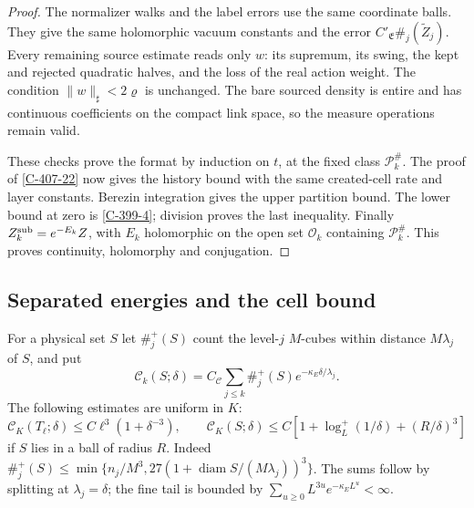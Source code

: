 \documentclass[11pt,letterpaper,reqno]{amsart}
\theoremstyle{definition}
\theoremstyle{remark}
\begin{document}
\begin{proof}
The normalizer walks and the label errors use the same
coordinate balls. They give the same holomorphic vacuum
constants and the error $C'_{\mathfrak E}\#_j(\widetilde Z_j)$.
Every remaining source estimate reads only $w$: its supremum,
its swing, the kept and rejected quadratic halves, and the
loss of the real action weight. The condition
$\|w\|_\sharp<2\varrho$ is unchanged. The bare sourced
density is entire and has continuous coefficients on the
compact link space, so the measure operations remain valid.

These checks prove the format by induction on $t$, at the
fixed class $\mathcal P_k^\#$. The proof of \cref{C-407-22}
now gives the history bound with the same created-cell rate
and layer constants. Berezin integration gives the upper
partition bound. The lower bound at zero is
\cref{C-399-4}; division proves the last inequality.
Finally $Z_k^{\rm sub}=e^{-E_k}Z$, with $E_k$ holomorphic on
the open set $\mathscr O_k$ containing $\mathcal P_k^\#$.
This proves continuity, holomorphy and conjugation.
\end{proof}

\subsection{Separated energies and the cell bound}

For a physical set $S$ let $\#_j^+(S)$ count the level-$j$
$M$-cubes within distance $M\lambda_j$ of $S$, and put
\[
 \mathscr C_k(S;\delta)=C_{\mathscr C}
       \sum_{j\le k}\#_j^+(S)e^{-\kappa_E\delta/\lambda_j}.
\]
The following estimates are uniform in $K$:
\begin{equation}\label{eq:qcd-source-count}
 \mathscr C_K(T_\ell;\delta)\le C\ell^3(1+\delta^{-3}),
 \qquad
 \mathscr C_K(S;\delta)\le
 C[1+\log_L^+(1/\delta)+(R/\delta)^3]
\end{equation}
if $S$ lies in a ball of radius $R$.
Indeed $\#_j^+(S)\le
\min\{n_j/M^3,27(1+\operatorname{diam}S/(M\lambda_j))^3\}$.
The sums follow by splitting at $\lambda_j=\delta$;
the fine tail is bounded by
$\sum_{u\ge0}L^{3u}e^{-\kappa_E L^u}<\infty$.
\end{document}
